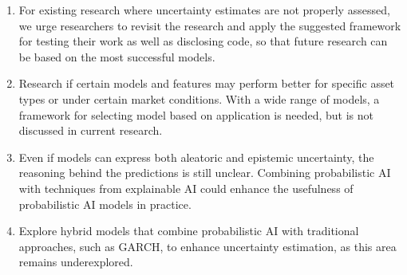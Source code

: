 \begin{enumerate}
    \item For existing research where uncertainty estimates are not properly assessed, we urge researchers to revisit the research and apply the suggested framework for testing their work as well as disclosing code, so that future research can be based on the most successful models.
    \item Research if certain models and features may perform better for specific asset types or under certain market conditions. With a wide range of models, a framework for selecting model based on application is needed, but is not discussed in current research. 
    \item Even if models can express both aleatoric and epistemic uncertainty, the reasoning behind the predictions is still unclear. Combining probabilistic AI with techniques from explainable AI could enhance the usefulness of probabilistic AI models in practice.
    \item Explore hybrid models that combine probabilistic AI with traditional approaches, such as GARCH, to enhance uncertainty estimation, as this area remains underexplored.
\end{enumerate}

